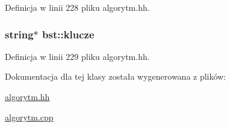 Definicja w linii 228 pliku algorytm.\-hh.

\hypertarget{classbst_a7e0cb2caf584c2de1d5ba767731c9c3a}{
\subsubsection[{klucze}]{\setlength{\rightskip}{0pt plus 5cm}string$\ast$ bst\-::klucze\hspace{0.3cm}{\ttfamily [private]}}}\label{classbst_a7e0cb2caf584c2de1d5ba767731c9c3a}


Definicja w linii 229 pliku algorytm.\-hh.



Dokumentacja dla tej klasy została wygenerowana z plików\-:\begin{DoxyCompactItemize}
\item 
\hyperlink{algorytm_8hh}{algorytm.\-hh}\item 
\hyperlink{algorytm_8cpp}{algorytm.\-cpp}\end{DoxyCompactItemize}
